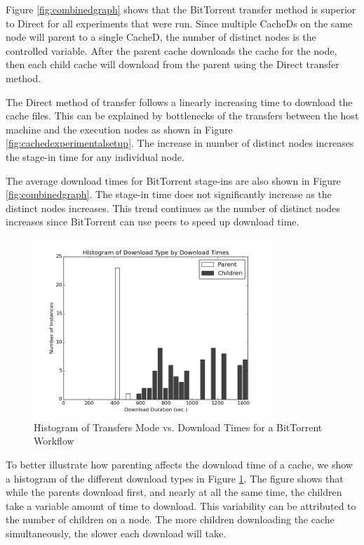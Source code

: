 Figure \ref{fig:combinedgraph} shows that the BitTorrent transfer method is superior to Direct for all experiments that were run.  Since multiple CacheDs on the same node will parent to a single CacheD, the number of distinct nodes is the controlled variable.  After the parent cache downloads the cache for the node, then each child cache will download from the parent using the Direct transfer method.

The Direct method of transfer follows a linearly increasing time to download the cache files.  This can be explained by bottlenecks of the transfers between the host machine and the execution nodes as shown in Figure \ref{fig:cachedexperimentalsetup}.  The increase in number of distinct nodes increases the stage-in time for any individual node.

The average download times for BitTorrent stage-ins are also shown in Figure \ref{fig:combinedgraph}.  The stage-in time does not significantly increase as the distinct nodes increases.  This trend continues as the number of distinct nodes increases since BitTorrent can use peers to speed up download time.

\begin{figure}[h!t]
\centering
\includegraphics[width=0.8\textwidth]{images/modes_vs_downloadtimes-grayscale.png}
\caption{Histogram of Transfers Mode vs. Download Times for a BitTorrent Workflow}
\label{fig:histmethod}
\end{figure}

To better illustrate how parenting affects the download time of a cache, we show a histogram of the different download types in Figure \ref{fig:histmethod}.  The figure shows that while the parents download first, and nearly at all the same time, the children take a variable amount of time to download.  This variability can be attributed to the number of children on a node.  The more children downloading the cache simultaneously, the slower each download will take. 

